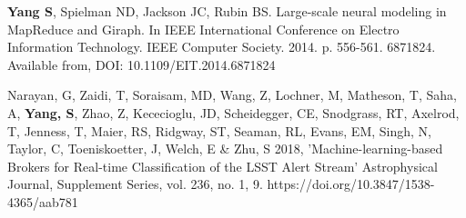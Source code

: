 

\begin{cvpubs}

  \cvpub
    {\textbf{Yang S}, Spielman ND, Jackson JC, Rubin BS. Large-scale neural
    modeling in MapReduce and Giraph. In IEEE International Conference
    on Electro Information Technology. IEEE Computer
    Society. 2014. p. 556-561. 6871824. Available from, DOI:
    10.1109/EIT.2014.6871824}

  \cvpub
    {Narayan, G, Zaidi, T, Soraisam, MD, Wang, Z, Lochner, M, Matheson, T, Saha, A, \textbf{Yang, S}, Zhao, Z, Kececioglu, JD, Scheidegger, CE, Snodgrass, RT, Axelrod, T, Jenness, T, Maier, RS, Ridgway, ST, Seaman, RL, Evans, EM, Singh, N, Taylor, C, Toeniskoetter, J, Welch, E \& Zhu, S 2018, 'Machine-learning-based Brokers for Real-time Classification of the LSST Alert Stream' Astrophysical Journal, Supplement Series, vol. 236, no. 1, 9. https://doi.org/10.3847/1538-4365/aab781}

\end{cvpubs}
